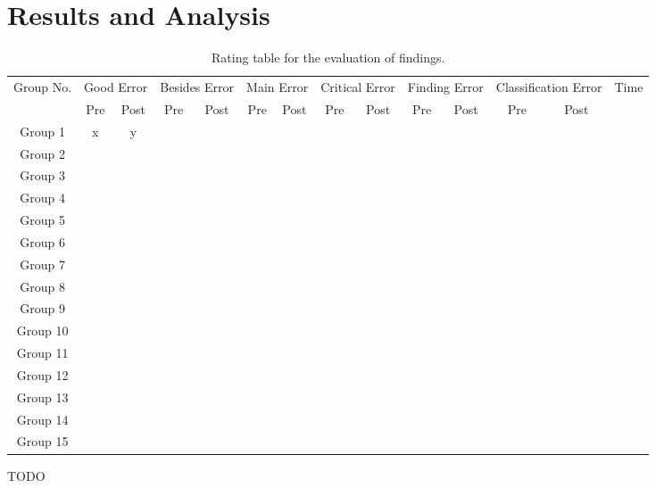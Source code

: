\section{Results and Analysis}

\begin{table*}[t]
\centering
\begin{tabular}{cccccccccccccc}
  \rowcolor{heading}Group No. &  \multicolumn{2}{r}{Good Error} & \multicolumn{2}{r}{Besides Error} & \multicolumn{2}{r}{Main Error} & \multicolumn{2}{r}{Critical Error} & \multicolumn{2}{r}{Finding Error} & \multicolumn{2}{r}{Classification Error} & Time\\
  \rowcolor{b} & Pre & Post & Pre & Post & Pre & Post & Pre & Post & Pre & Post & Pre & Post & \\
  \rowcolor{a}Group 1 & x & y &&&&&&&&&&& \\
  \rowcolor{b}Group 2 &&&&&&&&&&&&& \\
  \rowcolor{a}Group 3 &&&&&&&&&&&&& \\
  \rowcolor{b}Group 4 &&&&&&&&&&&&& \\
  \rowcolor{a}Group 5 &&&&&&&&&&&&& \\
  \rowcolor{b}Group 6 &&&&&&&&&&&&& \\
  \rowcolor{a}Group 7 &&&&&&&&&&&&& \\
  \rowcolor{b}Group 8 &&&&&&&&&&&&& \\
  \rowcolor{a}Group 9 &&&&&&&&&&&&& \\
  \rowcolor{b}Group 10 &&&&&&&&&&&&& \\
  \rowcolor{a}Group 11 &&&&&&&&&&&&& \\
  \rowcolor{b}Group 12 &&&&&&&&&&&&& \\
  \rowcolor{a}Group 13 &&&&&&&&&&&&& \\
  \rowcolor{b}Group 14 &&&&&&&&&&&&& \\
  \rowcolor{a}Group 15 &&&&&&&&&&&&& \\
\end{tabular}
\caption{Rating table for the evaluation of findings.}
\label{tab:ratings}
\end{table*}

TODO